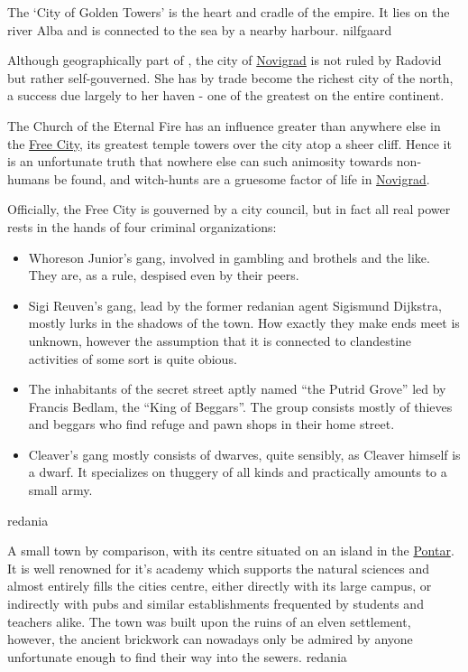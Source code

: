 {
    The `City of Golden Towers' is the heart and cradle of the empire. It lies on the river Alba and is connected to the
    sea by a nearby harbour.
}
{nilfgaard}

{
    Although geographically part of , the city of \hyperref[city:novigrad]{Novigrad} is not ruled by Radovid but rather self-gouverned.
    She has by trade become the richest city of the north, a success due largely to her haven - one of the greatest on the entire continent.

    The Church of the Eternal Fire has an influence greater than anywhere else in the \hyperref[city:novigrad]{Free City}, its greatest temple towers over the city atop a sheer cliff.
    Hence it is an unfortunate truth that nowhere else can such animosity towards non-humans be found, and witch-hunts are a gruesome factor of life in \hyperref[city:novigrad]{Novigrad}.

    Officially, the Free City is gouverned by a city council, but in fact all real power rests in the hands of four criminal organizations:
    \begin{itemize}
        \item Whoreson Junior's gang, involved in gambling and brothels and the like. They are, as a rule, despised even by their peers.
        \item Sigi Reuven's gang, lead by the former redanian agent Sigismund Dijkstra, mostly lurks in the shadows of the town.
              How exactly they make ends meet is unknown, however the assumption that it is connected to clandestine activities of some sort
              is quite obious.
        \item The inhabitants of the secret street aptly named ``the Putrid Grove'' led by Francis Bedlam, the ``King of Beggars''.
              The group consists mostly of thieves and beggars who find refuge and pawn shops in their home street.
        \item Cleaver's gang mostly consists of dwarves, quite sensibly, as Cleaver himself is a dwarf. It specializes on thuggery of all
              kinds and practically amounts to a small army.
    \end{itemize}
}
{redania}

{
    A small town by comparison, with its centre situated on an island in the \hyperref[region:pontar]{Pontar}. It is well renowned for it's academy
    which supports the natural sciences and almost entirely fills the cities centre, either directly with its large campus, or indirectly
    with pubs and similar establishments frequented by students and teachers alike. The town was built upon the ruins of an elven settlement,
    however, the ancient brickwork can nowadays only be admired by anyone unfortunate enough to find their way into the sewers.
}
{redania}

